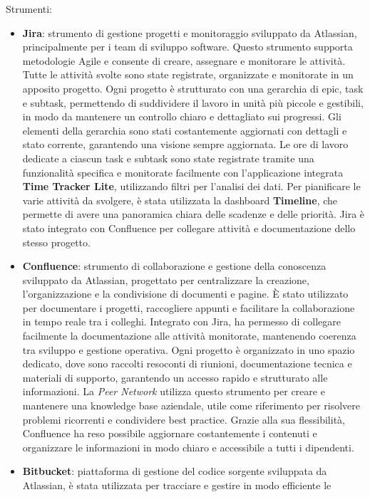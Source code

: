 Strumenti:
\begin{itemize}
    \item \textbf{Jira}: strumento di gestione progetti e monitoraggio sviluppato da Atlassian, principalmente per i team di sviluppo software. Questo strumento
    supporta metodologie Agile e consente di creare, assegnare e monitorare le attività. Tutte le attività svolte sono state registrate, organizzate e monitorate
    in un apposito progetto. Ogni progetto è strutturato con una gerarchia di epic, task e subtask, permettendo di suddividere il lavoro in unità più piccole e
    gestibili, in modo da mantenere un controllo chiaro e dettagliato sui progressi. Gli elementi della gerarchia sono stati costantemente aggiornati con dettagli
    e stato corrente, garantendo una visione sempre aggiornata. Le ore di lavoro dedicate a ciascun task e subtask sono state registrate tramite una funzionalità
    specifica e monitorate facilmente con l’applicazione integrata \textbf{Time Tracker Lite}, utilizzando filtri per l’analisi dei dati. Per pianificare le varie attività
    da svolgere, è stata utilizzata la dashboard \textbf{Timeline}, che permette di avere una panoramica chiara delle scadenze e delle priorità. Jira è stato integrato con
    Confluence per collegare attività e documentazione dello stesso progetto.
    \item \textbf{Confluence}: strumento di collaborazione e gestione della conoscenza sviluppato da Atlassian, progettato per centralizzare la creazione, l'organizzazione
    e la condivisione di documenti e pagine. È stato utilizzato per documentare i progetti, raccogliere appunti e facilitare la collaborazione in tempo reale tra i colleghi.
    Integrato con Jira, ha permesso di collegare facilmente la documentazione alle attività monitorate, mantenendo coerenza tra sviluppo e gestione operativa. Ogni progetto
    è organizzato in uno spazio dedicato, dove sono raccolti resoconti di riunioni, documentazione tecnica e materiali di supporto, garantendo un accesso rapido e
    strutturato alle informazioni. La \textit{Peer Network} utilizza questo strumento per creare e mantenere una knowledge base aziendale, utile come riferimento per risolvere
    problemi ricorrenti e condividere best practice. Grazie alla sua flessibilità, Confluence ha reso possibile aggiornare costantemente i contenuti e organizzare le
    informazioni in modo chiaro e accessibile a tutti i dipendenti.
    \item \textbf{Bitbucket}: piattaforma di gestione del codice sorgente sviluppata da Atlassian, è stata utilizzata per tracciare e gestire in modo efficiente le

\end{itemize}
